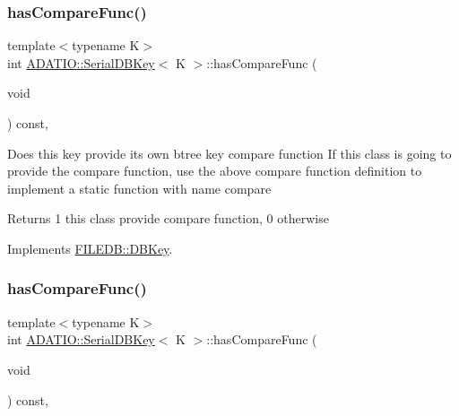 \mbox{\label{classADATIO_1_1SerialDBKey_a2f28d2ac39919d9cb9f6fc097944c49c}} 
\subsubsection{\texorpdfstring{hasCompareFunc()}{hasCompareFunc()}\hspace{0.1cm}{\footnotesize\ttfamily [1/2]}}
{\footnotesize\ttfamily template$<$typename K$>$ \\
int \mbox{\hyperlink{classADATIO_1_1SerialDBKey}{A\+D\+A\+T\+I\+O\+::\+Serial\+D\+B\+Key}}$<$ K $>$\+::has\+Compare\+Func (\begin{DoxyParamCaption}\item[{void}]{ }\end{DoxyParamCaption}) const\hspace{0.3cm}{\ttfamily [inline]}, {\ttfamily [virtual]}}

Does this key provide its own btree key compare function If this class is going to provide the compare function, use the above compare function definition to implement a static function with name compare

\begin{DoxyReturn}{Returns}
1 this class provide compare function, 0 otherwise 
\end{DoxyReturn}


Implements \mbox{\hyperlink{classFILEDB_1_1DBKey_a416c32ba10caf76e6b7ff4986cfc3c05}{F\+I\+L\+E\+D\+B\+::\+D\+B\+Key}}.

\mbox{\label{classADATIO_1_1SerialDBKey_a2f28d2ac39919d9cb9f6fc097944c49c}} 
\subsubsection{\texorpdfstring{hasCompareFunc()}{hasCompareFunc()}\hspace{0.1cm}{\footnotesize\ttfamily [2/2]}}
{\footnotesize\ttfamily template$<$typename K$>$ \\
int \mbox{\hyperlink{classADATIO_1_1SerialDBKey}{A\+D\+A\+T\+I\+O\+::\+Serial\+D\+B\+Key}}$<$ K $>$\+::has\+Compare\+Func (\begin{DoxyParamCaption}\item[{void}]{ }\end{DoxyParamCaption}) const\hspace{0.3cm}{\ttfamily [inline]}, {\ttfamily [virtual]}}

